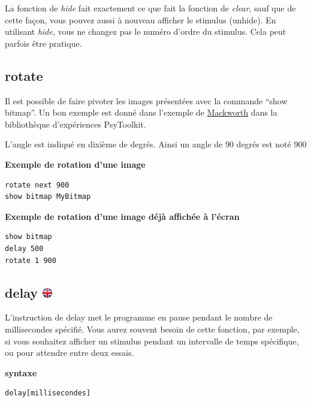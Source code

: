 \documentclass[
]{book}
\begin{document}
La fonction de \emph{hide} fait exactement ce que fait la fonction de
\emph{clear}, sauf que de cette façon, vous pouvez aussi à nouveau
afficher le stimulus (unhide). En utilisant \emph{hide}, vous ne changez
pas le numéro d'ordre du stimulus. Cela peut parfois être pratique.

\hypertarget{rotate}{%
\subsection{rotate}\label{rotate}}

Il est possible de faire pivoter les images présentées avec la commande
``show bitmap''. Un bon exemple est donné dans l'exemple de
\href{http://www.psytoolkit.org/experiment-library/mackworth.html}{Mackworth}
dans la bibliothèque d'expériences PsyToolkit.

L'angle est indiqué en dixième de degrés. Ainsi un angle de 90 degrés
est noté 900

\textbf{Exemple de rotation d'une image}

\begin{verbatim}
rotate next 900
show bitmap MyBitmap
\end{verbatim}

\textbf{Exemple de rotation d'une image déjà affichée à l'écran}

\begin{verbatim}
show bitmap
delay 500
rotate 1 900
\end{verbatim}

\hypertarget{delay}{%
\subsection[delay ]{\texorpdfstring{delay
\href{https://www.psytoolkit.org/doc3.2.0/syntax.html\#task-delay}{\protect\includegraphics{img/ukflag.png}}}{delay }}\label{delay}}

L'instruction de delay met le programme en pause pendant le nombre de
millisecondes spécifié. Vous aurez souvent besoin de cette fonction, par
exemple, si vous souhaitez afficher un stimulus pendant un intervalle de
temps spécifique, ou pour attendre entre deux essais.

\textbf{syntaxe}

\begin{verbatim}
delay[millisecondes]
\end{verbatim}
\end{document}
